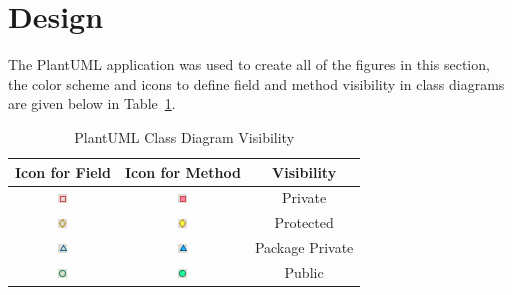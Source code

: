 \section{Design}\label{sec:dsg}

  The PlantUML application was used to create all of the figures in this
  section, the color scheme and icons to define field and method visibility
  in class diagrams are given below in Table~\ref{tab:uml-vis}.

  \begin{table}[H]
    \centering
    \begin{tabular}{c c c}
      \toprule
      Icon for Field & Icon for Method & Visibility \\ [0.5ex]
      \midrule
      \includegraphics{figures/design/field-private} & \includegraphics{figures/design/method-private} & Private \\
      \includegraphics{figures/design/field-protected} & \includegraphics{figures/design/method-protected} & Protected \\
      \includegraphics{figures/design/field-package-private} & \includegraphics{figures/design/method-package-private} & Package Private \\
      \includegraphics{figures/design/field-public} & \includegraphics{figures/design/method-public} & Public \\
      \bottomrule
    \end{tabular}
    \caption{PlantUML Class Diagram Visibility}\label{tab:uml-vis}
  \end{table}


